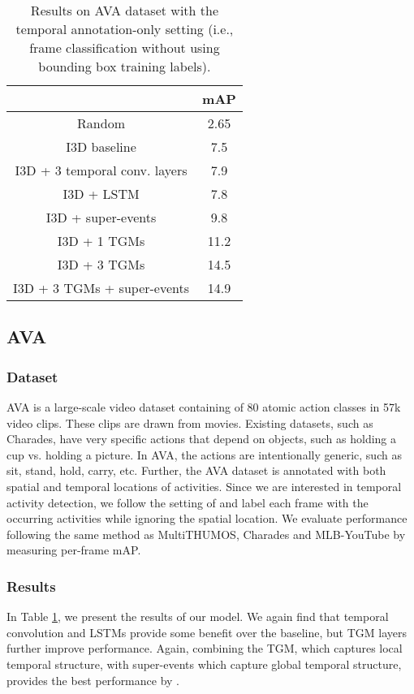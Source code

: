 \documentclass{article}
\begin{document}
\begin{table}
\caption{Results on AVA dataset with the temporal annotation-only setting (i.e., frame classification without using bounding box training labels).}
\label{tab:ava}
\centering
\begin{tabular}{c|c}
\toprule
 & mAP \\
\midrule
Random & 2.65 \\
I3D baseline                                 & 7.5 \\
I3D + 3 temporal conv. layers                 & 7.9    \\
I3D + LSTM                                   & 7.8 \\
I3D + super-events\citep{piergiovanni2018super}                   & 9.8 \\
I3D + 1 TGMs                                   & 11.2  \\
I3D + 3 TGMs                                   & 14.5 \\
I3D + 3 TGMs + super-events                     & 14.9  \\
\bottomrule
\end{tabular}
\end{table}

\subsection{AVA}
\subsubsection{Dataset}
AVA \citep{ava2017} is a large-scale video dataset containing of 80 atomic action classes in 57k video clips. These clips are drawn from movies. Existing datasets, such as Charades, have very specific actions that depend on objects, such as holding a cup vs. holding a picture. In AVA, the actions are intentionally generic, such as sit, stand, hold, carry, etc. Further, the AVA dataset is annotated with both spatial and temporal locations of activities. Since we are interested in temporal activity detection, we follow the setting of \citet{piergiovanni2018super} and label each frame with the occurring activities while ignoring the spatial location. We evaluate performance following the same method as MultiTHUMOS, Charades and MLB-YouTube by measuring per-frame mAP.

\subsubsection{Results}
In Table \ref{tab:ava}, we present the results of our model. We again find that temporal convolution and LSTMs provide some benefit over the baseline, but TGM layers further improve performance. Again, combining the TGM, which captures local temporal structure, with super-events which capture global temporal structure, provides the best performance by .
\end{document}

